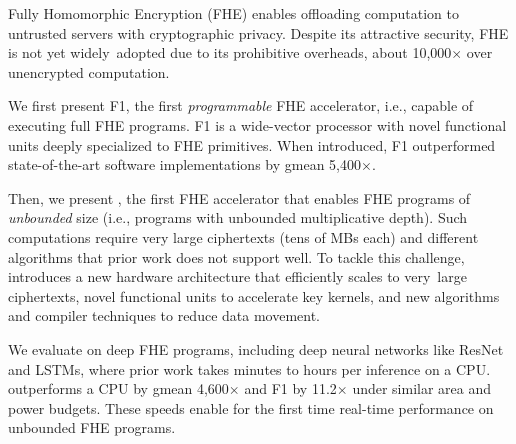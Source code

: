 Fully Homomorphic Encryption (FHE) enables
offloading computation to untrusted servers with cryptographic privacy.
Despite its attractive security,
FHE is not yet widely~adopted due to its prohibitive overheads,
about 10,000$\times$ over unencrypted computation.

We first present F1, the first \emph{programmable} FHE accelerator,
i.e., capable of executing full FHE programs. F1 is a wide-vector
processor with novel functional units deeply specialized to FHE
primitives. When introduced, F1 outperformed state-of-the-art software implementations
by gmean 5,400$\times$.

Then, we present \name, the first FHE accelerator that enables
FHE programs of \emph{unbounded} size
(i.e., programs with unbounded multiplicative depth).
Such computations require very large ciphertexts (tens of MBs each)
and different algorithms that prior work does not support well.
To tackle this challenge, \name introduces a new hardware architecture
that efficiently scales to very~large ciphertexts,
novel functional units to accelerate key kernels,
and new algorithms and compiler techniques to reduce data movement.

We evaluate \name on deep FHE programs,
including deep neural networks like ResNet and LSTMs,
where prior work takes minutes to hours per inference on a CPU.
\name outperforms a CPU by gmean 4,600$\times$ and
F1 by 11.2$\times$ under similar area
and power budgets.
These speeds enable for the first time real-time performance
on unbounded FHE programs.
